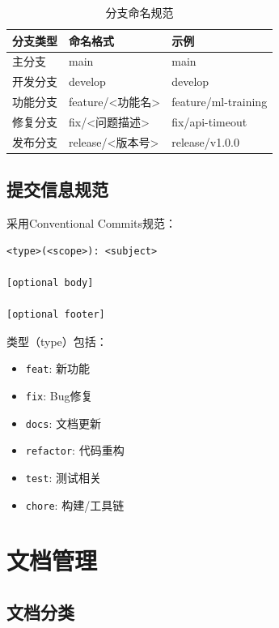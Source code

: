 \begin{table}[htbp]
    \centering
    \caption{分支命名规范}
    \label{tab:branch_naming}
    \begin{tabular}{lp{4cm}l}
        \toprule
        \textbf{分支类型} & \textbf{命名格式} & \textbf{示例}         \\
        \midrule
        主分支           & main          & main                \\
        开发分支          & develop       & develop             \\
        功能分支          & feature/<功能名> & feature/ml-training \\
        修复分支          & fix/<问题描述>    & fix/api-timeout     \\
        发布分支          & release/<版本号> & release/v1.0.0      \\
        \bottomrule
    \end{tabular}
\end{table}

\subsection{提交信息规范}

采用Conventional Commits规范：

\begin{lstlisting}[caption=Git提交信息格式]
<type>(<scope>): <subject>

[optional body]

[optional footer]
\end{lstlisting}

类型（type）包括：
\begin{itemize}
    \item \texttt{feat}: 新功能
    \item \texttt{fix}: Bug修复
    \item \texttt{docs}: 文档更新
    \item \texttt{refactor}: 代码重构
    \item \texttt{test}: 测试相关
    \item \texttt{chore}: 构建/工具链
\end{itemize}

\section{文档管理}

\subsection{文档分类}

